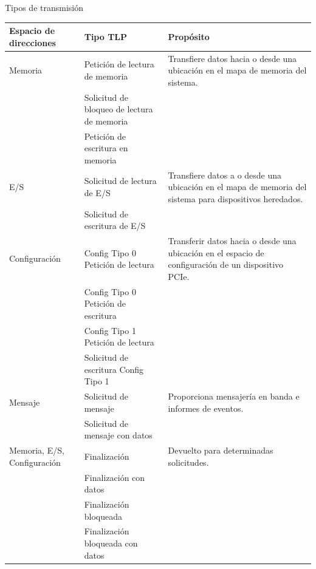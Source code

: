\documentclass[presentation]{beamer}
\begin{document}
\begin{frame}[label={sec:orgd21d508}]{Tipos de transmisión}
\begin{center}
\begin{tabular}{lll}
Espacio de direcciones & Tipo TLP & Propósito\\[0pt]
\hline
Memoria & Petición de lectura de memoria & Transfiere datos hacia o desde una ubicación en el mapa de memoria del sistema.\\[0pt]
 & Solicitud de bloqueo de lectura de memoria & \\[0pt]
 & Petición de escritura en memoria & \\[0pt]
\hline
E/S & Solicitud de lectura de E/S & Transfiere datos a o desde una ubicación en el mapa de memoria del sistema para dispositivos heredados.\\[0pt]
 & Solicitud de escritura de E/S & \\[0pt]
\hline
Configuración & Config Tipo 0 Petición de lectura & Transferir datos hacia o desde una ubicación en el espacio de configuración de un dispositivo PCIe.\\[0pt]
 & Config Tipo 0 Petición de escritura & \\[0pt]
 & Config Tipo 1 Petición de lectura & \\[0pt]
 & Solicitud de escritura Config Tipo 1 & \\[0pt]
\hline
Mensaje & Solicitud de mensaje & Proporciona mensajería en banda e informes de eventos.\\[0pt]
 & Solicitud de mensaje con datos & \\[0pt]
\hline
Memoria, E/S, Configuración & Finalización & Devuelto para determinadas solicitudes.\\[0pt]
 & Finalización con datos & \\[0pt]
 & Finalización bloqueada & \\[0pt]
 & Finalización bloqueada con datos & \\[0pt]
\end{tabular}
\end{center}
\end{frame}
\end{document}
